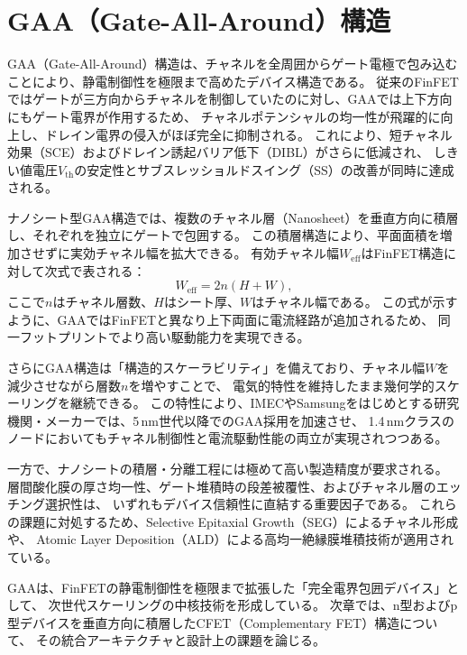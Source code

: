 \section{GAA（Gate-All-Around）構造}
GAA（Gate-All-Around）構造は、チャネルを全周囲からゲート電極で包み込むことにより、静電制御性を極限まで高めたデバイス構造である。  
従来のFinFETではゲートが三方向からチャネルを制御していたのに対し、GAAでは上下方向にもゲート電界が作用するため、  
チャネルポテンシャルの均一性が飛躍的に向上し、ドレイン電界の侵入がほぼ完全に抑制される。  
これにより、短チャネル効果（SCE）およびドレイン誘起バリア低下（DIBL）がさらに低減され、  
しきい値電圧$V_{\mathrm{th}}$の安定性とサブスレッショルドスイング（SS）の改善が同時に達成される。

ナノシート型GAA構造では、複数のチャネル層（Nanosheet）を垂直方向に積層し、それぞれを独立にゲートで包囲する。  
この積層構造により、平面面積を増加させずに実効チャネル幅を拡大できる。  
有効チャネル幅$W_{\mathrm{eff}}$はFinFET構造に対して次式で表される：
\begin{equation}
  W_{\mathrm{eff}} = 2n(H + W),
\end{equation}
ここで$n$はチャネル層数、$H$はシート厚、$W$はチャネル幅である。  
この式が示すように、GAAではFinFETと異なり上下両面に電流経路が追加されるため、  
同一フットプリントでより高い駆動能力を実現できる。

さらにGAA構造は「構造的スケーラビリティ」を備えており、チャネル幅$W$を減少させながら層数$n$を増やすことで、  
電気的特性を維持したまま幾何学的スケーリングを継続できる。  
この特性により、IMECやSamsungをはじめとする研究機関・メーカーでは、5\,nm世代以降でのGAA採用を加速させ、  
1.4\,nmクラスのノードにおいてもチャネル制御性と電流駆動性能の両立が実現されつつある。

一方で、ナノシートの積層・分離工程には極めて高い製造精度が要求される。  
層間酸化膜の厚さ均一性、ゲート堆積時の段差被覆性、およびチャネル層のエッチング選択性は、  
いずれもデバイス信頼性に直結する重要因子である。  
これらの課題に対処するため、Selective Epitaxial Growth（SEG）によるチャネル形成や、  
Atomic Layer Deposition（ALD）による高均一絶縁膜堆積技術が適用されている。

GAAは、FinFETの静電制御性を極限まで拡張した「完全電界包囲デバイス」として、  
次世代スケーリングの中核技術を形成している。  
次章では、n型およびp型デバイスを垂直方向に積層したCFET（Complementary FET）構造について、  
その統合アーキテクチャと設計上の課題を論じる。



